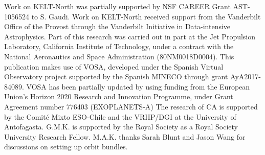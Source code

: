 \documentclass{aa}
\begin{document}
\begin{acknowledgements}
%
Work on KELT-North was partially supported by NSF CAREER Grant AST-1056524 to S. Gaudi.
%
Work on KELT-North received support from the Vanderbilt Office of the Provost through the Vanderbilt Initiative in Data-intensive Astrophysics.
%
Part of this research was carried out in part at the Jet Propulsion Laboratory, California Institute of Technology, under a contract with the National Aeronautics and Space Administration (80NM0018D0004).
%
This publication makes use of VOSA, developed under the Spanish Virtual Observatory project supported by the Spanish MINECO through grant AyA2017-84089.
%
VOSA has been partially updated by using funding from the European Union's Horizon 2020 Research and Innovation Programme, under Grant Agreement number 776403 (EXOPLANETS-A)
%
The research of CA is supported by the Comit\'e Mixto ESO-Chile and the VRIIP/DGI at the University of Antofagasta.
%
G.M.K. is supported by the Royal Society as a Royal Society University Research Fellow.
%
M.A.K. thanks Sarah Blunt and Jason Wang for discussions on setting up orbit bundles.

\end{acknowledgements}


\end{document}

